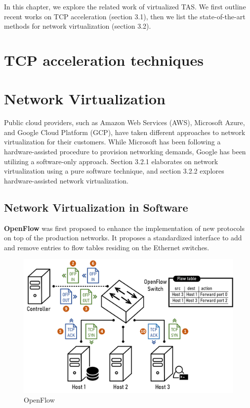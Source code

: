  In this chapter, we explore the related work of virtualized TAS. We first outline recent 
 works on TCP acceleration (section 3.1), then we list the state-of-the-art methods for network virtualization (section 3.2).



\section{TCP acceleration techniques}


\section{Network Virtualization}
Public cloud providers, such as Amazon Web Services (AWS), Microsoft Azure, 
and Google Cloud Platform (GCP), have taken different approaches to network 
virtualization for their customers. While Microsoft has been following a 
hardware-assisted procedure to provision networking demands, Google has been 
utilizing a software-only approach. Section 3.2.1 elaborates on network 
virtualization using a pure software technique, and section 3.2.2 explores 
hardware-assisted network virtualization.


\subsection{Network Virtualization in Software}
\textbf{OpenFlow} was first proposed to enhance the implementation of 
new protocols on top of the production networks. It proposes a standardized 
interface to add and remove entries to flow tables residing on the Ethernet 
switches.\cite{mckeown2008openflow}

\begin{figure}
\small
\center
\includegraphics[width=\textwidth]{../Figures/openflow.png}
\caption{OpenFlow}
\label{fig:openflow}
\end{figure}

